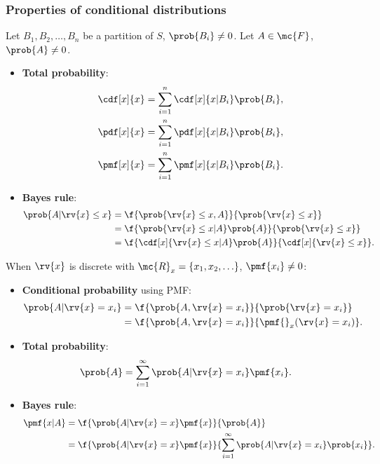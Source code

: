 \subsubsection*{Properties of conditional distributions}
Let $B_{1}, B_{2}, \ldots, B_{n}$ be a partition of $S$, $\prob{B_{i}}\neq 0$. Let $A\in\mc{F}$, $\prob{A}\neq0$.
\begin{itemize}
    \item \textbf{Total probability}:
    \begin{align}
        \cdf[x]{x} &= \sum_{i=1}^{n} \cdf[x]{x|B_{i}}\prob{B_{i}},\\
        \pdf[x]{x} &= \sum_{i=1}^{n} \pdf[x]{x|B_{i}}\prob{B_{i}},\\
        \pmf[x]{x} &= \sum_{i=1}^{n} \pmf[x]{x|B_{i}}\prob{B_{i}}.
    \end{align}
    \item \textbf{Bayes rule}: 
    \begin{align}
        \prob{A|\rv{x}\leq x} 
        &= \f{\prob{\rv{x}\leq x, A}}{\prob{\rv{x}\leq x}}\\
        &= \f{\prob{\rv{x}\leq x|A}\prob{A}}{\prob{\rv{x}\leq x}}\\
        &= \f{\cdf[x]{\rv{x}\leq x|A}\prob{A}}{\cdf[x]{\rv{x}\leq x}}.
    \end{align}
\end{itemize}
When $\rv{x}$ is discrete with $\mc{R}_{x}=\left\{ x_{1},x_{2},\ldots\right\}$, $\pmf{x_{i}}\neq0$:
\begin{itemize}
    \item \textbf{Conditional probability} using PMF:
    \begin{align}
        \prob{A|\rv{x}=x_{i}} 
        &= \f{\prob{A,\rv{x}=x_{i}}}{\prob{\rv{x}=x_{i}}}\\
        &= \f{\prob{A,\rv{x}=x_{i}}}{\pmf{}_{x}({\rv{x}=x_{i}})}.
    \end{align}
    \item \textbf{Total probability}:
    \begin{align}
        \prob{A} &= \sum_{i=1}^{\infty}\prob{A|\rv{x}=x_{i}}\pmf{x_{i}}.
    \end{align}
    \item \textbf{Bayes rule}:
    \begin{align}
        \pmf{x|A} 
        &= \f{\prob{A|\rv{x}=x}\pmf{x}}{\prob{A}}\\
        &= \f{\prob{A|\rv{x}=x}\pmf{x}}{\sum_{i=1}^{\infty}\prob{A|\rv{x}=x_{i}}\prob{x_{i}}}.
    \end{align}
\end{itemize}
